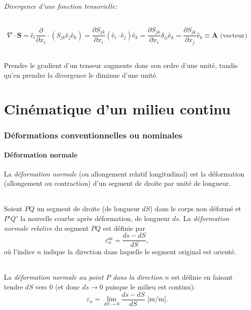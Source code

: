 \paragraph{Divergence d'une fonction tensorielle:}
$$\nabla\cdot\textbf{S}=\textbf{ê}_i\frac{\partial}{\partial x_i}\cdot(S_{jk}\textbf{ê}_j\textbf{ê}_k)=\frac{\partial S_{jk}}{\partial x_i}(\textbf{ê}_i\cdot\textbf{ê}_j)\textbf{ê}_k=\frac{\partial S_{jk}}{\partial x_i}\delta_{ij}\textbf{ê}_k=\frac{\partial S_{jk}}{\partial x_j}\textbf{ê}_k\equiv \textbf{A} \text{ (vecteur)}$$
\paragraph{}
Prendre le gradient d'un tenseur augmente donc son ordre d'une unité, tandis qu'en prendre la divergence le diminue d'une unité.

\part{Cinématique d'un milieu continu}
\section{Déformations conventionnelles ou nominales}
\subsection{Déformation normale}
La \emph{déformation normale} (ou allongement relatif longitudinal) est la déformation (allongement ou contraction) d'un segment de droite par unité de longueur.
\paragraph{}
Soient $PQ$ un segment de droite (de longueur $dS$) dans le corps non déformé et $P'Q'$ la nouvelle courbe après déformation, de longueur $ds$. La \emph{déformation normale relative} du segment $PQ$ est définie par
$$\varepsilon_n^{\text{nr}}=\frac{ds-dS}{dS},$$ où l'indice $n$ indique la direction dans laquelle le segment original est orienté.
\paragraph{}
La \emph{déformation normale au point $P$ dans la direction $n$} est définie en faisant tendre $dS$ vers 0 (et donc $ds\rightarrow 0$ puisque le milieu est continu): 
$$\varepsilon_n=\lim_{dS\rightarrow 0}\frac{ds-dS}{dS} \text{  [m/m]}.$$

